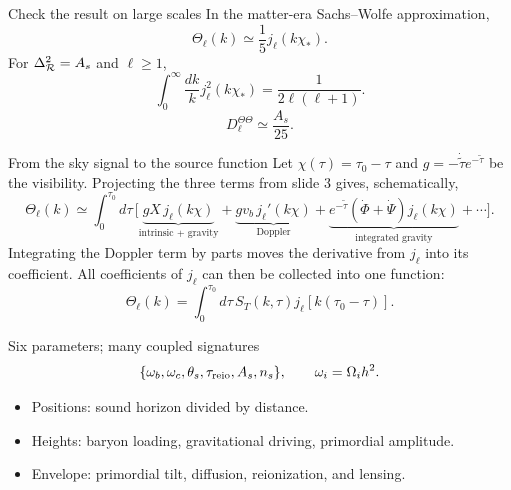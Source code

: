 \begin{frame}{Check the result on large scales}
In the matter-era Sachs--Wolfe approximation,
\[\Theta_\ell(k)\simeq\frac15j_\ell(k\chi_*).\]
For $\Delta_{\mathcal R}^2=A_s$ and $\ell\geq1$,
\[\int_0^\infty\frac{dk}{k}j_\ell^2(k\chi_*)
=\frac1{2\ell(\ell+1)}.\]
\[\boxed{D_\ell^{\Theta\Theta}\simeq\frac{A_s}{25}.}\]
\end{frame}

\begin{frame}{From the sky signal to the source function}
\small
Let $\chi(\tau)=\tau_0-\tau$ and $g=-\dot{\widetilde\tau}e^{-\widetilde\tau}$ be the visibility. Projecting the three terms from slide 3 gives, schematically,
\[
\Theta_\ell(k)\simeq\int_0^{\tau_0}\!d\tau\,
\bigl[
\underbrace{gX\,j_\ell(k\chi)}_{\text{intrinsic + gravity}}
+\underbrace{g v_b\,j_\ell'(k\chi)}_{\text{Doppler}}
+\underbrace{e^{-\widetilde\tau}(\dot\Phi+\dot\Psi)j_\ell(k\chi)}_{\text{integrated gravity}}
+\cdots\bigr].
\]
Integrating the Doppler term by parts moves the derivative from $j_\ell$ into its coefficient. All coefficients of $j_\ell$ can then be collected into one function:
\[
\boxed{\Theta_\ell(k)=\int_0^{\tau_0}d\tau\,S_T(k,\tau)
j_\ell[k(\tau_0-\tau)].}
\]
\end{frame}

\begin{frame}{Six parameters; many coupled signatures}
\[\{\omega_b,\omega_c,\theta_s,\tau_{\rm reio},A_s,n_s\},
\qquad \omega_i=\Omega_i h^2.\]
\begin{itemize}
\item Positions: sound horizon divided by distance.
\item Heights: baryon loading, gravitational driving, primordial amplitude.
\item Envelope: primordial tilt, diffusion, reionization, and lensing.
\end{itemize}
\end{frame}

